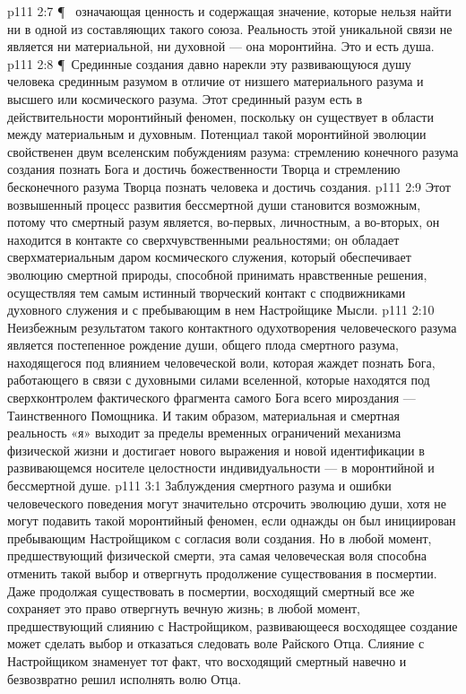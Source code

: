 \vs p111 2:7 \P\ \bibnobreakspace {} означающая ценность и содержащая значение, которые нельзя найти ни в одной из составляющих такого союза. Реальность этой уникальной связи не является ни материальной, ни духовной --- она моронтийна. Это и есть душа.
\vs p111 2:8 \P\ Срединные создания давно нарекли эту развивающуюся душу человека срединным разумом в отличие от низшего материального разума и высшего или космического разума. Этот срединный разум есть в действительности моронтийный феномен, поскольку он существует в области между материальным и духовным. Потенциал такой моронтийной эволюции свойственен двум вселенским побуждениям разума: стремлению конечного разума создания познать Бога и достичь божественности Творца и стремлению бесконечного разума Творца познать человека и достичь  создания.
\vs p111 2:9 Этот возвышенный процесс развития бессмертной души становится возможным, потому что смертный разум является, во\hyp{}первых, личностным, а во\hyp{}вторых, он находится в контакте со сверхчувственными реальностями; он обладает сверхматериальным даром космического служения, который обеспечивает эволюцию смертной природы, способной принимать нравственные решения, осуществляя тем самым истинный творческий контакт с сподвижниками духовного служения и с пребывающим в нем Настройщике Мысли.
\vs p111 2:10 Неизбежным результатом такого контактного одухотворения человеческого разума является постепенное рождение души, общего плода смертного разума, находящегося под влиянием человеческой воли, которая жаждет познать Бога, работающего в связи с духовными силами вселенной, которые находятся под сверхконтролем фактического фрагмента самого Бога всего мироздания --- Таинственного Помощника. И таким образом, материальная и смертная реальность «я» выходит за пределы временных ограничений механизма физической жизни и достигает нового выражения и новой идентификации в развивающемся носителе целостности индивидуальности --- в моронтийной и бессмертной душе.
\vs p111 3:1 Заблуждения смертного разума и ошибки человеческого поведения могут значительно отсрочить эволюцию души, хотя не могут подавить такой моронтийный феномен, если однажды он был инициирован пребывающим Настройщиком с согласия воли создания. Но в любой момент, предшествующий физической смерти, эта самая человеческая воля способна отменить такой выбор и отвергнуть продолжение существования в посмертии. Даже продолжая существовать в посмертии, восходящий смертный все же сохраняет это право отвергнуть вечную жизнь; в любой момент, предшествующий слиянию с Настройщиком, развивающееся восходящее создание может сделать выбор и отказаться следовать воле Райского Отца. Слияние с Настройщиком знаменует тот факт, что восходящий смертный навечно и безвозвратно решил исполнять волю Отца.

